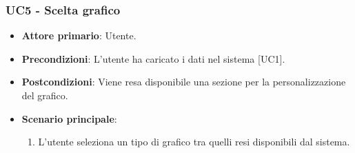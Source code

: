 \subsubsection{UC5 - Scelta grafico}
\begin{itemize}
	\item \textbf{Attore primario}: Utente.
	\item \textbf{Precondizioni}: L'utente ha caricato i dati nel sistema [UC1].
	\item \textbf{Postcondizioni}: Viene resa disponibile una sezione per la personalizzazione del grafico.
	\item \textbf{Scenario principale}:
		\begin{enumerate}
			\item L'utente seleziona un tipo di grafico tra quelli resi disponibili dal sistema.
		\end{enumerate}
\end{itemize}